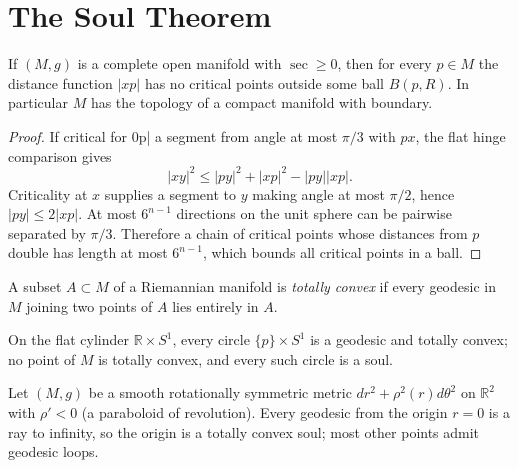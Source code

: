 \section{The Soul Theorem}

\begin{lemma}
  \label{lem:pet-ch12-gromov-critical-point-estimate}

  If $(M,g)$ is a complete open manifold with $\sec\ge0$, then for every $p\in M$
  the distance function $|xp|$ has no critical points outside some ball
  $B(p,R)$. In particular $M$ has the topology of a compact manifold with
  boundary.
\end{lemma}
\begin{proof}
  \sketch
  If  critical for 0\cdot p| a segment from   angle at
  most \(\pi/3\) with \(px\), the flat hinge comparison gives
  \[ |xy|^2\le |py|^2+|xp|^2-|py||xp|. \]
  Criticality at \(x\) supplies a segment to \(y\) making angle at most
  \(\pi/2\), hence \( |py|\le2|xp|\). At most \(6^{n-1}\) directions on
  the unit sphere can be pairwise separated by \(\pi/3\). Therefore a chain
  of critical points whose distances from \(p\) double has length at most
  \(6^{n-1}\), which bounds all critical points in a ball.
\end{proof}

\begin{definition}
  \label{def:pet-ch12-totally-convex}

  A subset $A\subset M$ of a Riemannian manifold is \emph{totally convex} if
  every geodesic in $M$ joining two points of $A$ lies entirely in $A$.
\end{definition}

\begin{example}
  \label{ex:pet-ch12-totally-convex-cylinder}

  On the flat cylinder $\mathbb{R}\times S^1$, every circle $\{p\}\times S^1$ is
  a geodesic and totally convex; no point of $M$ is totally convex, and every
  such circle is a soul.
\end{example}

\begin{example}
  \label{ex:pet-ch12-totally-convex-paraboloid}

  Let $(M,g)$ be a smooth rotationally symmetric metric
  $dr^2+\rho^2(r)d\theta^2$ on $\mathbb{R}^2$ with $\rho'<0$ (a paraboloid of
  revolution). Every geodesic from the origin $r=0$ is a ray to infinity, so the
  origin is a totally convex soul; most other points admit geodesic loops.
\end{example}

